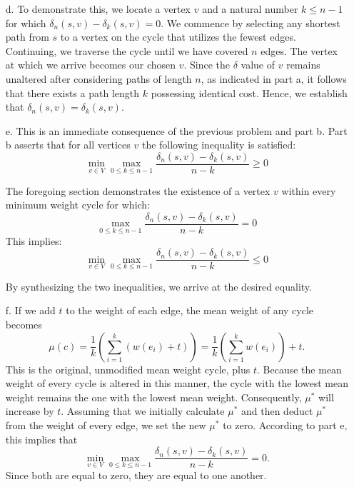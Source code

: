 \documentclass{article}
\begin{document}
\begin{enumerate}
    
    \item[d.] To demonstrate this, we locate a vertex $v$ and a natural number $k \leq n-1$ for which $\delta_n(s, v) - \delta_k(s, v) = 0$. We commence by selecting any shortest path from $s$ to a vertex on the cycle that utilizes the fewest edges. Continuing, we traverse the cycle until we have covered $n$ edges. The vertex at which we arrive becomes our chosen $v$. Since the $\delta$ value of $v$ remains unaltered after considering paths of length $n$, as indicated in part a, it follows that there exists a path length $k$ possessing identical cost. Hence, we establish that $\delta_n(s, v) = \delta_k(s, v)$.

    
    \item[e.] This is an immediate consequence of the previous problem and part b. Part b asserts that for all vertices $v$ the following inequality is satisfied:
    \begin{equation}
    \min_{v \in V} \max_{0 \leq k \leq n-1} \frac{\delta_n(s,v) - \delta_k(s,v)}{n - k} \geq 0
    \end{equation}

    The foregoing section demonstrates the existence of a vertex $v$ within every minimum weight cycle for which:
    \begin{equation}
    \max_{0 \leq k \leq n-1} \frac{\delta_n(s,v) - \delta_k(s,v)}{n - k} = 0
    \end{equation}
    This implies:
    \begin{equation}
    \min_{v \in V} \max_{0 \leq k \leq n-1} \frac{\delta_n(s,v) - \delta_k(s,v)}{n - k} \leq 0
    \end{equation}

    By synthesizing the two inequalities, we arrive at the desired equality.

    \item[f.] If we add $t$ to the weight of each edge, the mean weight of any cycle becomes
    \begin{equation}
    \mu(c) = \frac{1}{k} \left(\sum_{i=1}^{k} (w(e_i) + t)\right) = \frac{1}{k} \left(\sum_{i=1}^{k} w(e_i)\right) + t.
    \end{equation}
    This is the original, unmodified mean weight cycle, plus $t$. Because the mean weight of every cycle is altered in this manner, the cycle with the lowest mean weight remains the one with the lowest mean weight. Consequently, $\mu^*$ will increase by $t$. Assuming that we initially calculate $\mu^*$ and then deduct $\mu^*$ from the weight of every edge, we set the new $\mu^*$ to zero. According to part e, this implies that
    \begin{equation}
    \min_{v \in V} \max_{0 \leq k \leq n-1} \frac{\delta_n(s,v) - \delta_k(s,v)}{n - k} = 0.
    \end{equation}
    Since both are equal to zero, they are equal to one another.


\end{enumerate}
\end{document}
